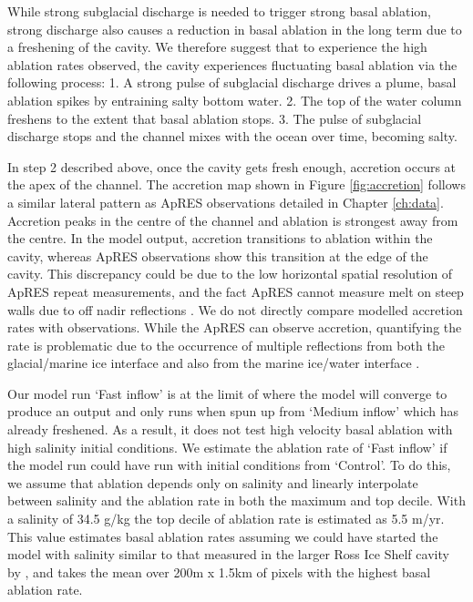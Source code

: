 While strong subglacial discharge is needed to trigger strong basal ablation, strong discharge also causes a reduction in basal ablation in the long term due to a freshening of the cavity. We therefore suggest that to experience the high ablation rates observed, the cavity experiences fluctuating basal ablation via the following process: 1. A strong pulse of subglacial discharge drives a plume, basal ablation spikes by entraining salty bottom water. 2. The top of the water column freshens to the extent that basal ablation stops.  3. The pulse of subglacial discharge stops and the channel mixes with the ocean over time, becoming salty.

In step 2 described above, once the cavity gets fresh enough, accretion occurs at the apex of the channel. The accretion map shown in Figure \ref{fig:accretion} follows a similar lateral pattern as ApRES observations detailed in Chapter \ref{ch:data}. 
Accretion peaks in the centre of the channel and ablation is strongest away from the centre. In the model output, accretion transitions to ablation within the cavity, whereas ApRES observations show this transition at the edge of the cavity.
This discrepancy could be due to the low horizontal spatial resolution of ApRES repeat measurements, and the fact ApRES cannot measure melt on steep walls due to off nadir reflections \citep{vavnkova2021deriving}. We do not directly compare modelled accretion rates with observations. While the ApRES can observe accretion, quantifying the rate is problematic due to the occurrence of multiple reflections from both the glacial/marine ice interface and also from the marine ice/water interface \citep{vavnkova2021nature}.


Our model run `Fast inflow' is at the limit of where the model will converge to produce an output and only runs when spun up from `Medium inflow' which has already freshened. As a result, it does not test high velocity basal ablation with high salinity initial conditions. We estimate the ablation rate of `Fast inflow' if the model run could have run with initial conditions from `Control'. To do this, we assume that ablation depends only on salinity and linearly interpolate between salinity and the ablation rate in both the maximum and top decile. With a salinity of 34.5 g/kg the top decile of ablation rate is estimated as 5.5 m/yr. This value estimates basal ablation rates assuming we could have started the model with salinity similar to that measured in the larger Ross Ice Shelf cavity by \cite{robinson2020ice}, and takes the mean over 200m x 1.5km of pixels with the highest basal ablation rate. 


